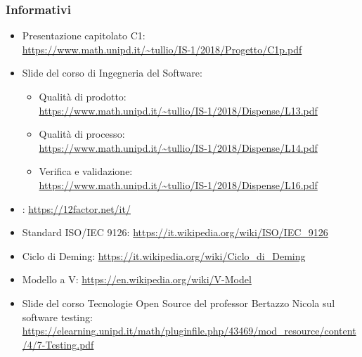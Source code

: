     \subsubsection{Informativi}\label{riferimenti informativi}
    \begin{itemize}
    	\item Presentazione capitolato C1:\\ \url{https://www.math.unipd.it/~tullio/IS-1/2018/Progetto/C1p.pdf}
    	\item Slide del corso di Ingegneria del Software:
    	
    	\begin{itemize}
    		\item Qualità di prodotto:\\ \url{https://www.math.unipd.it/~tullio/IS-1/2018/Dispense/L13.pdf}
    		\item Qualità di processo:\\ \url{https://www.math.unipd.it/~tullio/IS-1/2018/Dispense/L14.pdf}
    		\item Verifica e validazione:\\
    		\url{https://www.math.unipd.it/~tullio/IS-1/2018/Dispense/L16.pdf}
    	\end{itemize}
    	\item {}:
    	\url{https://12factor.net/it/}
    	\item Standard ISO/IEC 9126:
    	\url{https://it.wikipedia.org/wiki/ISO/IEC_9126}
    	\item Ciclo di Deming:
    	\url{https://it.wikipedia.org/wiki/Ciclo_di_Deming}
    	\item Modello a V:
    	\url{https://en.wikipedia.org/wiki/V-Model}
    	\item Slide del corso Tecnologie Open Source del professor Bertazzo Nicola sul software testing:\\
    	\url{https://elearning.unipd.it/math/pluginfile.php/43469/mod_resource/content/4/7-Testing.pdf}
    \end{itemize}